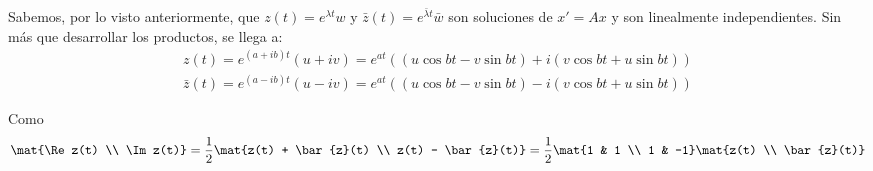 \documentclass[../ecuaciones_diferenciales.tex]{subfiles}
\begin{document}
  Sabemos, por lo visto anteriormente, que \(z(t) = e^{\lambda t} w\) y
  \(\bar{z}(t) = e^{\bar{\lambda} t} \bar{w}\) son soluciones de \(x' = Ax\) y
  son linealmente independientes. Sin más que desarrollar los productos, se
  llega a:
  \begin{gather*}
    z(t) = e^{(a+ib)t} (u+iv) = e^{at}\left( (u\cos bt - v\sin bt) + i(v\cos bt + u\sin bt) \right) \\
    \bar{z}(t) = e^{(a-ib)t} (u-iv) = e^{at}\left( (u\cos bt - v\sin bt) - i(v\cos bt + u\sin bt) \right)
  \end{gather*}

  Como
  \[\mat{\Re z(t) \\ \Im z(t)} = \frac{1}{2} \mat{z(t) + \bar{z}(t) \\
      z(t) - \bar{z}(t)} = \frac{1}{2}\mat{1 & 1 \\ 1 & -1}\mat{z(t) \\
      \bar{z}(t)} \]
\end{document}
